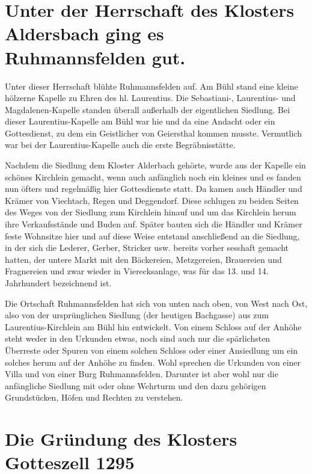 \documentclass[12pt,a4paper]{book}
\begin{document}
\section[Unter dem Kloster Aldersbach]{Unter der Herrschaft des Klosters
Aldersbach ging es Ruhmannsfelden gut.}

Unter dieser Herrschaft blühte Ruhmannsfelden auf. Am Bühl stand eine
kleine hölzerne Kapelle zu Ehren des hl. Laurentius. Die Sebastiani-,
Laurentius- und Magdalenen-Kapelle standen überall außerhalb der
eigentlichen Siedlung. Bei dieser Laurentius-Kapelle am Bühl war hie und
da eine Andacht oder ein Gottesdienst, zu dem ein Geistlicher von
Geiersthal kommen musste. Vermutlich war bei der Laurentius-Kapelle auch
die erste Begräbnisstätte.

Nachdem die Siedlung dem Kloster Alderbach gehörte, wurde aus der
Kapelle ein schönes Kirchlein gemacht, wenn auch anfänglich noch ein
kleines und es fanden nun öfters und regelmäßig hier Gottesdienste
statt. Da kamen auch Händler und Krämer von Viechtach, Regen und
Deggendorf. Diese schlugen zu beiden Seiten des Weges von der Siedlung
zum Kirchlein hinauf und um das Kirchlein herum ihre Verkaufsstände und
Buden auf. Später bauten sich die Händler und Krämer feste Wohnsitze
hier und auf diese Weise entstand anschließend an die Siedlung, in der
sich die Lederer, Gerber, Stricker usw. bereits vorher sesshaft gemacht
hatten, der untere Markt mit den Bäckereien, Metzgereien, Brauereien und
Fragnereien und zwar wieder in Vierecksanlage, was für das 13. und 14.
Jahrhundert bezeichnend ist.

Die Ortschaft Ruhmannsfelden hat sich von unten nach oben, von West nach
Ost, also von der ursprünglichen Siedlung (der heutigen Bachgasse) aus
zum Laurentius-Kirchlein am Bühl hin entwickelt. Von einem Schloss auf
der Anhöhe steht weder in den Urkunden etwas, noch sind auch nur die
spärlichsten Überreste oder Spuren von einem solchen Schloss oder einer
Ansiedlung um ein solches herum auf der Anhöhe zu finden. Wohl sprechen
die Urkunden von einer Villa und von einer Burg Ruhmannsfelden. Darunter
ist aber wohl nur die anfängliche Siedlung mit oder ohne Wehrturm und
den dazu gehörigen Grundstücken, Höfen und Rechten zu verstehen.

\section[Gründung des Klosters Gotteszell]{Die Gründung des Klosters
Gotteszell 1295}
\end{document}
